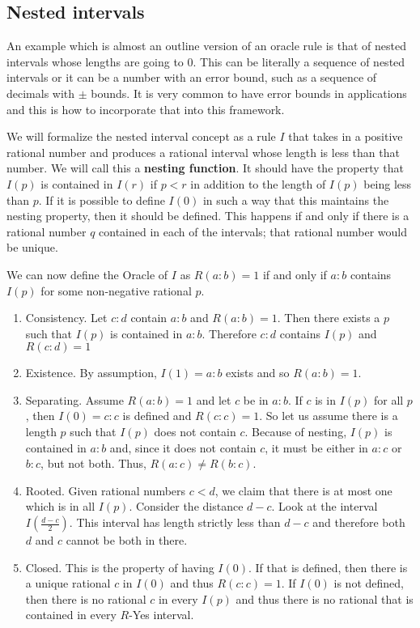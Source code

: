 \documentclass[12pt]{article}
\theoremstyle{remark}
\begin{document}
\subsection{Nested intervals} \label{sec:ni}

An example which is almost an outline version of an oracle rule is that of nested intervals whose lengths are going to 0. This can be literally a sequence of nested intervals or it can be a number with an error bound, such as a sequence of decimals with $\pm$ bounds. It is very common to have error bounds in applications and this is how to incorporate that into this framework. 

We will formalize the nested interval concept as a rule $I$ that takes in a positive rational number and produces a rational interval whose length is less than that number. We will call this a \textbf{nesting function}. It should have the property that $I(p)$ is contained in $I(r)$ if $p<r$ in addition to the length of $I(p)$ being less than $p$. If it is possible to define $I(0)$ in such a way that this maintains the nesting property, then it should be defined. This happens if and only if there is a rational number $q$ contained in each of the intervals; that rational number would be unique. 

We can now define the Oracle of $I$ as $R(a:b) = 1$ if and only if $a:b$ contains $I(p)$ for some non-negative rational $p$.

\begin{enumerate}
    \item Consistency. Let $c:d$ contain $a:b$ and $R(a:b)=1$. Then there exists a $p$ such that $I(p)$ is contained in $a:b$. Therefore $c:d$ contains $I(p)$ and $R(c:d) = 1$
    \item Existence. By assumption, $I(1)=a:b$ exists and so $R(a:b)=1$.
    \item Separating. Assume $R(a:b)=1$ and let $c$ be in $a:b$. If $c$ is in $I(p)$ for all $p$, then $I(0) = c:c$ is defined and $R(c:c)=1$. So let us assume there is a length $p$ such that $I(p)$ does not contain $c$. Because of nesting, $I(p)$ is contained in $a:b$ and, since it does not contain $c$, it must be either in $a:c$ or $b:c$, but not both. Thus, $R(a:c) \neq R(b:c)$.
    \item Rooted. Given rational numbers $c < d$, we claim that there is at most one which is in all $I(p)$. Consider the distance $d-c$. Look at the interval $I( \tfrac{d-c}{2} )$. This interval has length strictly less than $d-c$ and therefore both $d$ and $c$ cannot be both in there. 
    \item Closed. This is the property of having $I(0)$. If that is defined, then  there is a unique rational $c$ in $I(0)$ and thus $R(c:c)=1$. If $I(0)$ is not defined, then there is no rational $c$ in every $I(p)$ and thus there is no rational that is contained in every $R$-Yes interval. 
\end{enumerate}
\end{document}
